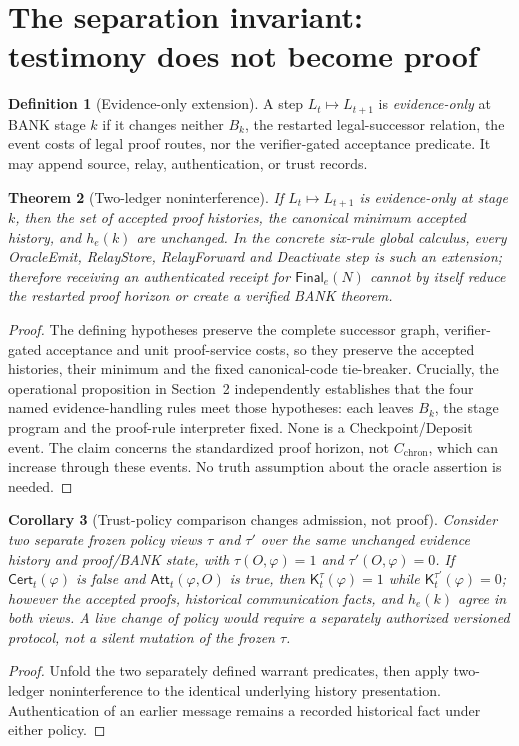 \documentclass[11pt,letterpaper]{article}
\newtheorem{theorem}{Theorem}[section]
\newtheorem{corollary}[theorem]{Corollary}
\theoremstyle{definition}
\newtheorem{definition}[theorem]{Definition}
\theoremstyle{remark}
\newcommand{\Fin}{\mathsf{Final}}
\newcommand{\Cert}{\mathsf{Cert}}
\newcommand{\Att}{\mathsf{Att}}
\begin{document}
\section{The separation invariant: testimony does not become proof}
\begin{definition}[Evidence-only extension]
A step $L_t\mapsto L_{t+1}$ is \emph{evidence-only} at BANK stage $k$ if it changes neither $B_k$, the restarted legal-successor relation, the event costs of legal proof routes, nor the verifier-gated acceptance predicate. It may append source, relay, authentication, or trust records.
\end{definition}
\begin{theorem}[Two-ledger noninterference]
If $L_t\mapsto L_{t+1}$ is evidence-only at stage $k$, then the set of accepted proof histories, the canonical minimum accepted history, and $h_e(k)$ are unchanged. In the concrete six-rule global calculus, every OracleEmit, RelayStore, RelayForward and Deactivate step is such an extension; therefore receiving an authenticated receipt for $\Fin_e(N)$ cannot by itself reduce the restarted proof horizon or create a verified BANK theorem.
\end{theorem}
\begin{proof}
The defining hypotheses preserve the complete successor graph, verifier-gated acceptance and unit proof-service costs, so they preserve the accepted histories, their minimum and the fixed canonical-code tie-breaker. Crucially, the operational proposition in Section~2 independently establishes that the four named evidence-handling rules meet those hypotheses: each leaves $B_k$, the stage program and the proof-rule interpreter fixed. None is a Checkpoint/Deposit event. The claim concerns the standardized proof horizon, not $C_{\mathrm{chron}}$, which can increase through these events. No truth assumption about the oracle assertion is needed.
\end{proof}

\begin{corollary}[Trust-policy comparison changes admission, not proof]
Consider two separate frozen policy views $\tau$ and $\tau'$ over the same unchanged evidence history and proof/BANK state, with $\tau(O,\varphi)=1$ and $\tau'(O,\varphi)=0$. If $\Cert_t(\varphi)$ is false and $\Att_t(\varphi,O)$ is true, then $\mathsf K_t^{\tau}(\varphi)=1$ while $\mathsf K_t^{\tau'}(\varphi)=0$; however the accepted proofs, historical communication facts, and $h_e(k)$ agree in both views. A live change of policy would require a separately authorized versioned protocol, not a silent mutation of the frozen $\tau$.
\end{corollary}
\begin{proof}
Unfold the two separately defined warrant predicates, then apply two-ledger noninterference to the identical underlying history presentation. Authentication of an earlier message remains a recorded historical fact under either policy.
\end{proof}
\end{document}
